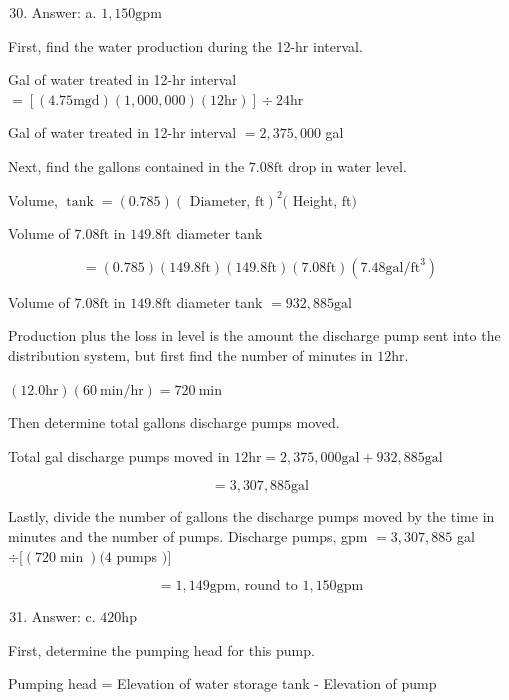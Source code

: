 \documentclass[10pt]{article}
\begin{document}
\begin{enumerate}
  \setcounter{enumi}{29}
  \item Answer: a. $1,150 \mathrm{gpm}$
\end{enumerate}

First, find the water production during the 12-hr interval.

Gal of water treated in 12-hr interval $=[(4.75 \mathrm{mgd})(1,000,000)(12 \mathrm{hr})] \div 24 \mathrm{hr}$

Gal of water treated in 12-hr interval $=2,375,000$ gal

Next, find the gallons contained in the $7.08 \mathrm{ft}$ drop in water level.

Volume, $\operatorname{tank}=(0.785)(\text { Diameter, } \mathrm{ft})^{2}($ Height, $\mathrm{ft})$

Volume of $7.08 \mathrm{ft}$ in $149.8 \mathrm{ft}$ diameter tank

$$
=(0.785)(149.8 \mathrm{ft})(149.8 \mathrm{ft})(7.08 \mathrm{ft})\left(7.48 \mathrm{gal} / \mathrm{ft}^{3}\right)
$$

Volume of $7.08 \mathrm{ft}$ in $149.8 \mathrm{ft}$ diameter tank $=932,885 \mathrm{gal}$

Production plus the loss in level is the amount the discharge pump sent into the distribution system, but first find the number of minutes in $12 \mathrm{hr}$.

$(12.0 \mathrm{hr})(60 \mathrm{~min} / \mathrm{hr})=720 \mathrm{~min}$

Then determine total gallons discharge pumps moved.

Total gal discharge pumps moved in $12 \mathrm{hr}=2,375,000 \mathrm{gal}+932,885 \mathrm{gal}$

$$
=3,307,885 \mathrm{gal}
$$

Lastly, divide the number of gallons the discharge pumps moved by the time in minutes and the number of pumps. Discharge pumps, gpm $=3,307,885$ gal $\div[(720 \min )(4$ pumps $)]$

$$
=1,149 \mathrm{gpm} \text {, round to } 1,150 \mathrm{gpm}
$$

\begin{enumerate}
  \setcounter{enumi}{30}
  \item Answer: c. $420 \mathrm{hp}$
\end{enumerate}

First, determine the pumping head for this pump.

Pumping head = Elevation of water storage tank - Elevation of pump
\end{document}
